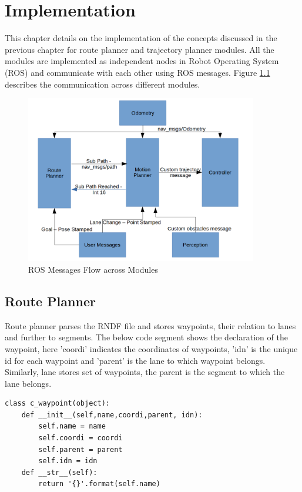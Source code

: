 \chapter{Implementation}
\label{implementation}
This chapter details on the implementation of the concepts discussed in the previous chapter for route planner and trajectory planner modules. All the modules are implemented as independent nodes in Robot Operating System (ROS) and communicate with each other using ROS messages. Figure \ref{message_flow} describes the communication across different modules. 

\begin{figure}[H]
	\centering
	\includegraphics[width=0.9\textwidth]{Images/implementation/message_flow.png}
	\caption{ROS Messages Flow across Modules}
	\label{message_flow}
\end{figure}


\section{Route Planner}
Route planner parses the RNDF file and stores waypoints, their relation to lanes and further to segments. The below code segment shows the declaration of the waypoint, here 'coordi' indicates the coordinates of waypoints, 'idn' is the unique id for each waypoint and 'parent' is the lane to which waypoint belongs. Similarly, lane stores set of waypoints, the parent is the segment to which the lane belongs. 

\begin{lstlisting}
class c_waypoint(object):
	def __init__(self,name,coordi,parent, idn):
		self.name = name
		self.coordi = coordi
		self.parent = parent
		self.idn = idn
	def __str__(self):
		return '{}'.format(self.name)

\end{lstlisting}

